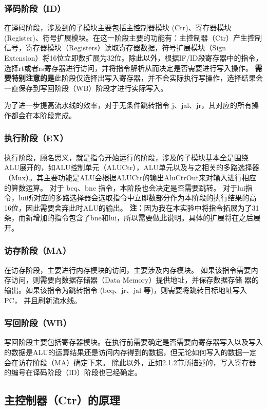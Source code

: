 \subsubsection{译码阶段（ID）}
在译码阶段，涉及到的子模块主要包括主控制器模块 (Ctr)、寄存器模块 (Register)、符号扩展模块。在这一阶段主要的功能有：主控制器（Ctr）产生控制信号，寄存器模块（Registers）读取寄存器数据，符号扩展模块（Sign Extension）将16位立即数扩展为32位。除此以外，根据IF/ID段寄存器中的指令，选择rt或者rs寄存器进行访问，并将指令解析从而决定是否需要进行写入操作。
\textbf{需要特别注意的是}此阶段仅选择出写入寄存器，并不会实际执行写操作，选择结果会一直保存到写回阶段（WB）阶段才进行实际写入。

为了进一步提高流水线的效率，对于无条件跳转指令 j、jal、jr，其对应的所有操作都会在本阶段完成。

\subsubsection{执行阶段（EX）}
执行阶段，顾名思义，就是指令开始运行的阶段，涉及的子模块基本全是围绕ALU展开的，如ALU控制单元（ALUCtr），ALU单元以及与之相关的多路选择器（Mux）。其主要功能是ALU会根据ALUCtr的输出AluCtrOut来对输入进行相应的算数运算。
对于 beq、bne 指令，本阶段也会决定是否需要跳转。
对于lui指令，lui所对应的多路选择器会选取指令中立即数部分作为本阶段的执行结果的高16位，因此需要舍弃此时ALU的输出。
\textbf{注：}因为我在本实验中将指令拓展为了31条，而新增加的指令包含了bne和lui，所以需要做此说明。具体的扩展将在之后展开。

\subsubsection{访存阶段（MA）}
在访存阶段，主要进行内存模块的访问，主要涉及内存模块。
如果该指令需要内存访问，则需要向数据存储器（Data Memory）提供地址，并保存数据存储
器的输出。如果该指令为跳转指令 (beq、jr、jal 等)，则需要将跳转目标地址写入PC，
并且刷新流水线。

\subsubsection{写回阶段（WB）}
写回阶段主要包括寄存器模块。在执行前需要确定是否需要向寄存器写入以及写入的数据是ALU的运算结果还是访问内存得到的数据，但无论如何写入的数据一定会在访存阶段（MA）确定下来。
除此以外，正如2.1.2节所描述的，写入寄存器的编号在译码阶段（ID）阶段也已经确定。

\subsection{主控制器（Ctr）的原理}

